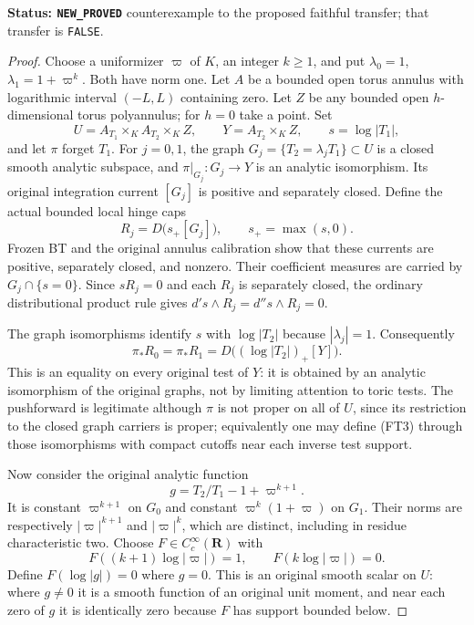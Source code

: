 \documentclass[11pt,a4paper]{article}
\numberwithin{equation}{section}
\theoremstyle{definition}
\theoremstyle{remark}
\begin{document}
\noindent\textbf{Status: \texttt{NEW\_PROVED}} counterexample
to the proposed faithful transfer; that transfer is \texttt{FALSE}.

\begin{proof}
Choose a uniformizer $\varpi$ of $K$, an integer $k\ge1$, and put
$\lambda_0=1$, $\lambda_1=1+\varpi^k$. Both have norm one.
Let $A$ be a bounded open torus annulus with logarithmic interval
$(-L,L)$ containing zero. Let $Z$ be any bounded open
$h$-dimensional torus polyannulus; for $h=0$ take a point. Set
\[
       U=A_{T_1}\times_K A_{T_2}\times_K Z,\qquad
       Y=A_{T_2}\times_K Z,\qquad
       s=\log|T_1|,
                                                                    \tag{FT1}
\]
and let $\pi$ forget $T_1$. For $j=0,1$, the graph
$G_j=\{T_2=\lambda_jT_1\}\subset U$ is a closed smooth analytic
subspace, and $\pi|_{G_j}:G_j\to Y$ is an analytic isomorphism.
Its original integration current $[G_j]$ is positive and
separately closed. Define the actual bounded local hinge caps
\[
                         R_j=D\bigl(s_+[G_j]\bigr),
                  \qquad s_+=\max(s,0).                            \tag{FT2}
\]
Frozen BT and the original annulus calibration show that these
currents are positive, separately closed, and nonzero. Their
coefficient measures are carried by $G_j\cap\{s=0\}$. Since
$sR_j=0$ and each $R_j$ is separately closed, the ordinary
distributional product rule gives
$d's\wedge R_j=d''s\wedge R_j=0$.

The graph isomorphisms identify $s$ with $\log|T_2|$ because
$|\lambda_j|=1$. Consequently
\[
                      \pi_*R_0=\pi_*R_1
                          =D\bigl((\log|T_2|)_+[Y]\bigr).           \tag{FT3}
\]
This is an equality on every original test of $Y$: it is obtained
by an analytic isomorphism of the original graphs, not by limiting
attention to toric tests. The pushforward is legitimate although
$\pi$ is not proper on all of $U$, since its restriction to the
closed graph carriers is proper; equivalently one may define (FT3)
through those isomorphisms with compact cutoffs near each inverse
test support.

Now consider the original analytic function
\[
                          g=T_2/T_1-1+\varpi^{k+1}.                 \tag{FT4}
\]
It is constant $\varpi^{k+1}$ on $G_0$ and constant
$\varpi^k(1+\varpi)$ on $G_1$. Their norms are respectively
$|\varpi|^{k+1}$ and $|\varpi|^k$, which are distinct, including
in residue characteristic two. Choose $F\in C_c^\infty(\mathbf R)$
with
\[
                  F((k+1)\log|\varpi|)=1,
                  \qquad F(k\log|\varpi|)=0.
\]
Define $F(\log|g|)=0$ where $g=0$. This is an original smooth
scalar on $U$: where $g\ne0$ it is a smooth function of an
original unit moment, and near each zero of $g$ it is identically
zero because $F$ has support bounded below.


\end{proof}
\end{document}
